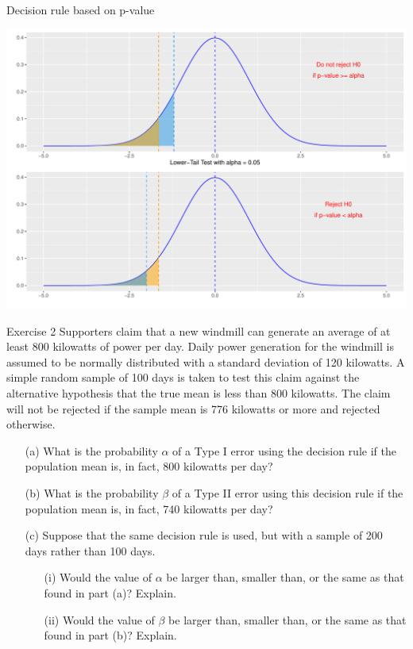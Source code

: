 \documentclass[
  10pt,
  ignorenonframetext,
]{beamer}
\begin{document}
\begin{frame}{Decision rule based on p-value}
\protect\hypertarget{decision-rule-based-on-p-value-2}{}
\begin{center}\includegraphics[width=1\linewidth]{ECON1013_Tutorial-4-_files/figure-beamer/unnamed-chunk-5-1} \end{center}
\end{frame}

\begin{frame}{Exercise 2}
\protect\hypertarget{exercise-2}{}
Supporters claim that a new windmill can generate an average of at least
800 kilowatts of power per day. Daily power generation for the windmill
is assumed to be normally distributed with a standard deviation of 120
kilowatts. A simple random sample of 100 days is taken to test this
claim against the alternative hypothesis that the true mean is less than
800 kilowatts. The claim will not be rejected if the sample mean is 776
kilowatts or more and rejected otherwise.

\begin{enumerate}
    \item [(a)] What is the probability $\alpha$ of a Type I error using the decision rule if the population mean is, in fact, 800 kilowatts per day?
    \item [(b)] What is the probability $\beta$ of a Type II error using this decision rule if the population mean is, in fact, 740 kilowatts per day?
    \item [(c)] Suppose that the same decision rule is used, but with a sample of 200 days rather than 100 days.
    \begin{enumerate}
        \item [(i)] Would the value of $\alpha$ be larger than, smaller than, or the same as that found in part (a)? Explain.
        \item [(ii)] Would the value of $\beta$ be larger than, smaller than, or the same as that found in part (b)? Explain.
    \end{enumerate}
\end{enumerate}
\end{frame}
\end{document}
